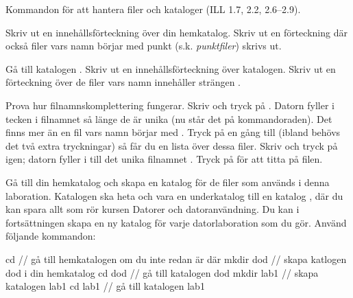 \begin{Datorarbete}
	\item Kommandon för att hantera filer och kataloger (ILL 1.7, 2.2, 2.6--2.9).

	\begin{Deluppgifter}
		\item Skriv ut en innehållsförteckning över din hemkatalog. Skriv ut en förteckning där också filer vars namn börjar med punkt (s.k. \emph{punktfiler}) skrivs ut.
		\item Gå till katalogen . Skriv ut en innehållsförteckning över katalogen. Skriv ut en förteckning över de filer vars namn innehåller strängen .
		\item Prova hur filnamnskomplettering fungerar. Skriv  och tryck på . Datorn fyller i tecken i filnamnet så länge de är unika (nu står det  på kommando\-raden). Det finns mer än en fil vars namn börjar med . Tryck på  en gång till (ibland behövs det två extra tryckningar) så får du en lista över dessa filer. Skriv  och tryck på  igen; datorn fyller i till det unika filnamnet . Tryck på  för att titta på filen.
		\item Gå till din hemkatalog och skapa en katalog för de filer som används i denna laboration. Katalogen ska heta  och vara en underkatalog till en katalog , där du kan spara allt som rör kursen Datorer och datoranvändning. Du kan i fortsättningen skapa en ny katalog för varje datorlaboration som du gör. Använd följande kommandon:

		\begin{Code}
			cd          // gå till hemkatalogen om du inte redan är där
			mkdir dod   // skapa katlogen dod i din hemkatalog
			cd dod      // gå till katalogen dod
			mkdir lab1  // skapa katalogen lab1
			cd lab1     // gå till katalogen lab1
		\end{Code}



\end{Deluppgifter}
\end{Datorarbete}
